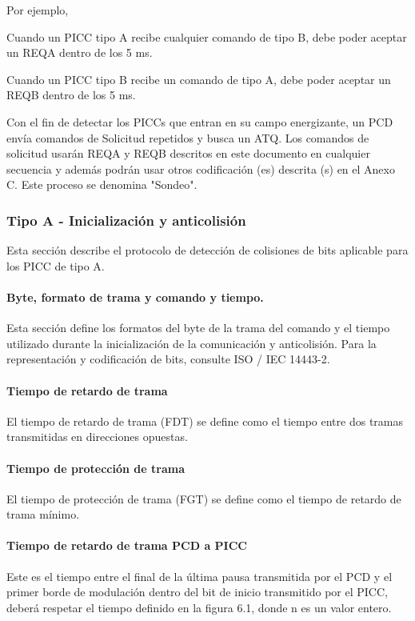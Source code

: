 Por ejemplo, \par

Cuando un PICC tipo A recibe cualquier comando de tipo B, debe poder aceptar un REQA dentro de los 5 ms.\par

Cuando un PICC tipo B recibe un comando de tipo A, debe poder aceptar un REQB dentro de los 5 ms.\par

Con el fin de detectar los PICCs que entran en su campo energizante, un PCD envía comandos de Solicitud repetidos y busca un ATQ. Los comandos de solicitud usarán REQA y REQB descritos en este documento en cualquier secuencia y además podrán usar otros codificación (es) descrita (s) en el Anexo C. Este proceso se denomina "Sondeo".\par

\subsubsection{Tipo A - Inicialización y anticolisión}
Esta sección describe el protocolo de detección de colisiones de bits aplicable para los PICC de tipo A.\par

\paragraph{Byte, formato de trama y comando y tiempo.}
Esta sección define los formatos del byte de la trama del comando y el tiempo utilizado durante la inicialización de la comunicación y anticolisión. Para la representación y codificación de bits, consulte ISO / IEC 14443-2.\par

\paragraph{Tiempo de retardo de trama}
El tiempo de retardo de trama (FDT) se define como el tiempo entre dos tramas transmitidas en direcciones opuestas.\par

\paragraph{Tiempo de protección de trama}
El tiempo de protección de trama (FGT) se define como el tiempo de retardo de trama mínimo.\par

\paragraph{Tiempo de retardo de trama PCD a PICC}
Este es el tiempo entre el final de la última pausa transmitida por el PCD y el primer borde de modulación dentro del bit de inicio transmitido por el PICC, deberá respetar el tiempo definido en la figura 6.1, donde n es un valor entero.\par


